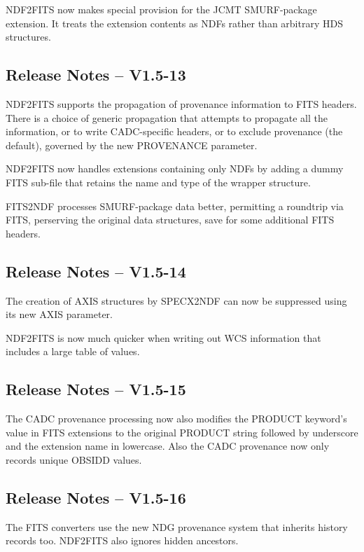 \documentclass[twoside,11pt]{article}
\newcommand{\htmlref}[2]{#1}
\begin{document}
\htmlref{NDF2FITS}{NDF2FITS} now makes special provision for the JCMT
SMURF-package extension.  It treats the extension contents as NDFs
rather than arbitrary HDS structures.

\subsection{Release Notes -- V1.5-13}

\htmlref{NDF2FITS}{NDF2FITS} supports the propagation of provenance
information to FITS headers.  There is a choice of generic propagation
that attempts to propagate all the information, or to write
CADC-specific headers, or to exclude provenance (the default),
governed by the new PROVENANCE parameter.

NDF2FITS now handles extensions containing only NDFs by adding a dummy
FITS sub-file that retains the name and type of the wrapper
structure.
 
\htmlref{FITS2NDF}{FITS2NDF} processes SMURF-package data
better, permitting a roundtrip via FITS, perserving the original
data structures, save for some additional FITS headers.

\subsection{Release Notes -- V1.5-14}

The creation of AXIS structures by \htmlref{SPECX2NDF}{SPECX2NDF} can 
now be suppressed using its new AXIS parameter.

\htmlref{NDF2FITS}{NDF2FITS} is now much quicker when writing out WCS
information that includes a large table of values.

\subsection{Release Notes -- V1.5-15}

The CADC provenance processing now also modifies the PRODUCT keyword's
value in FITS extensions to the original PRODUCT string followed by 
underscore and the extension name in lowercase.  Also the CADC 
provenance now only records unique OBSIDD values.

\subsection{Release Notes -- V1.5-16}

The FITS converters use the new NDG provenance system that inherits
history records too.  \htmlref{NDF2FITS}{NDF2FITS} also ignores hidden
ancestors.
\end{document}
